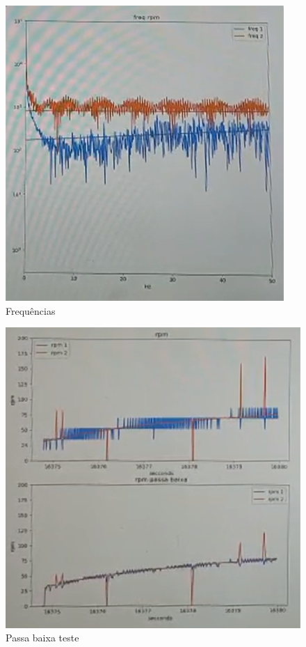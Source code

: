 \begin{figure}[h]
    \centering
    \includegraphics{figures/frequencia_medidas_altas}
    \caption{Frequências}
    \label{fig:frequencia_medidas_altas}
\end{figure}

\begin{figure}[h]
    \centering
    \includegraphics{figures/passa_baixa_teste}
    \caption{Passa baixa teste}
    \label{fig:passa_baixa_teste}
\end{figure}


